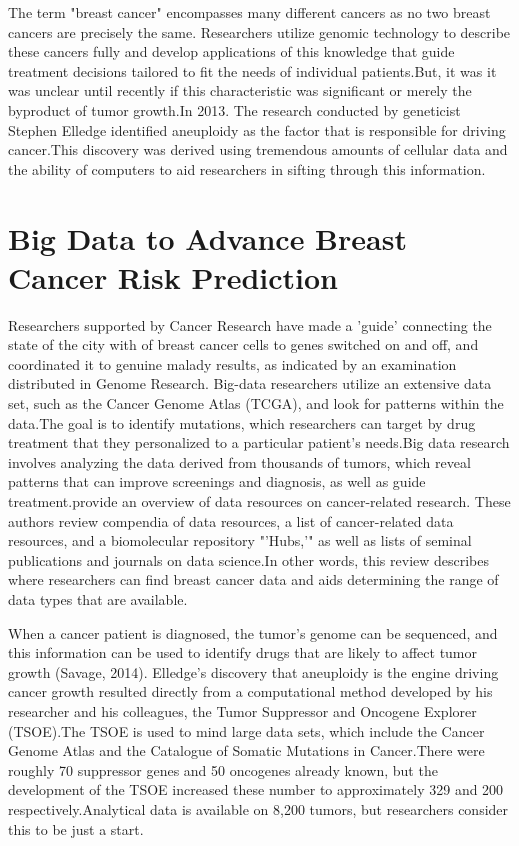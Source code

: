 \documentclass[sigconf]{acmart}
\begin{document}
The term "breast cancer" encompasses many different cancers as no two breast cancers are precisely the same. Researchers utilize genomic technology to describe these cancers fully and develop applications of this knowledge that guide treatment decisions tailored to fit the needs of individual patients\cite{adams}.But, it was it was unclear until recently if this characteristic was significant or merely the byproduct of tumor growth\cite{savage2014}.In 2013. The research conducted by geneticist Stephen Elledge identified aneuploidy as the factor that is responsible for driving cancer\cite{savage2014}.This discovery was derived using tremendous amounts of cellular data and the ability of computers to aid researchers in sifting through this information\cite{savage2014}.

\section{Big Data to Advance Breast Cancer Risk Prediction}

Researchers supported by Cancer Research have made a 'guide' connecting the state of the city with  of breast cancer cells to genes switched on and off, and coordinated it to genuine malady results, as indicated by an examination distributed in Genome Research\cite{hiatt1999new}.
Big-data researchers utilize an extensive data set, such as the Cancer Genome Atlas (TCGA), and look for patterns within the data\cite{adams}.The goal is to identify mutations, which researchers can target by drug treatment that they personalized to a particular patient's needs\cite{adams}.Big data research involves analyzing the data derived from thousands of tumors, which reveal patterns that can improve screenings and diagnosis, as well as guide treatment\cite{adams}.\cite{clare2016}provide an overview of data resources on cancer-related research. These authors review compendia of data resources, a list of cancer-related data resources, and a biomolecular repository "'Hubs,'" as well as lists of seminal publications and journals on data science\cite{clare2016}.In other words, this review describes where researchers can find breast cancer data and aids determining the range of data types that are available\cite{clare2016}.

When a cancer patient is diagnosed, the tumor's genome can be sequenced, and this information can be used to identify drugs that are likely to affect tumor growth (Savage, 2014). Elledge's discovery that aneuploidy is the engine driving cancer growth resulted directly from a computational method developed by his researcher and his colleagues, the Tumor Suppressor and Oncogene Explorer (TSOE)\cite{savage2014}.The TSOE is used to mind large data sets, which include the Cancer Genome Atlas and the Catalogue of Somatic Mutations in Cancer\cite{savage2014}.There were roughly 70 suppressor genes and 50 oncogenes already known, but the development of the TSOE increased these number to approximately 329 and 200 respectively\cite{savage2014}.Analytical data is available on 8,200 tumors, but researchers consider this to be just a start\cite{savage2014}.
\end{document}
